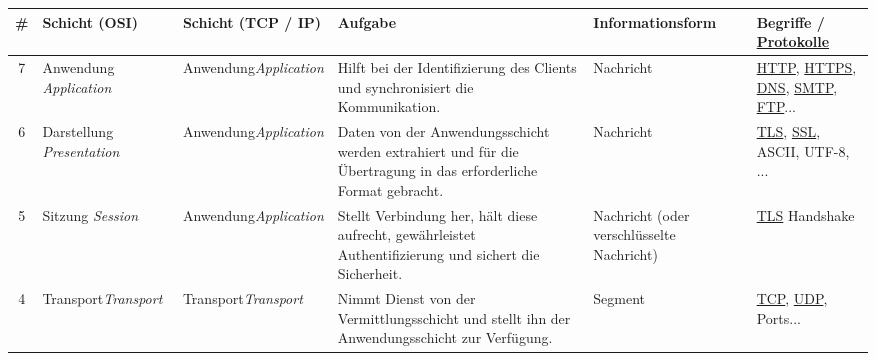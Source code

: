\begin{tabular}{c|m{2.6cm}||m{2cm}||m{4.6cm}|m{2.5cm}|m{2cm}}
		\textbf{\#}              & \textbf{Schicht (\acrshort{OSI})}                     & \textbf{Schicht \newline (\acrshort{TCP} / \acrshort{IP})}  & \textbf{Aufgabe}                                                                                                & \textbf{Informations\-form}               & \textbf{Begriffe / \newline \underline{Protokolle}}   \\ \midrule\midrule
		\rowcolor{\applicationLayerColor!10}7    & Anwendung \newline \textit{Application}    & Anwendung\newline\textit{Application} & Hilft bei der Identifizierung des Clients und synchronisiert die Kommunikation.                                 & Nachricht                                 & \underline{\acrshort{HTTP}}, \underline{\acrshort{HTTPS}}, \underline{\acrshort{DNS}}, \underline{\acrshort{SMTP}}, \underline{\acrshort{FTP}}...        \\\midrule
		\rowcolor{\applicationLayerColor!20}6    & Darstellung \newline \textit{Presentation} & Anwendung\newline\textit{Application} & Daten von der Anwendungsschicht werden extrahiert und für die Übertragung in das erforderliche Format gebracht. & Nachricht                                 & \underline{\acrshort{TLS}}, \underline{\acrshort{SSL}}, \acrshort{ASCII}, \acrshort{UTF-8}, ...      \\\midrule
		\rowcolor{yellow!30}5    & Sitzung \newline \textit{Session}          & Anwendung\newline\textit{Application} & Stellt Verbindung her, hält diese aufrecht, gewährleistet Authentifizierung und sichert die Sicherheit.         & Nachricht (oder verschlüsselte Nachricht) & \underline{\acrshort{TLS}} Handshake           \\\midrule
		\rowcolor{\transportLayerColor!20}4    & Transport\newline \textit{Transport}       & Transport\newline\textit{Transport}   & Nimmt Dienst von der Vermittlungsschicht und stellt ihn der Anwendungsschicht zur Verfügung.                    & Segment                                   & \underline{\acrshort{TCP}}, \underline{\acrshort{UDP}}, Ports... \\\midrule

\end{tabular}
